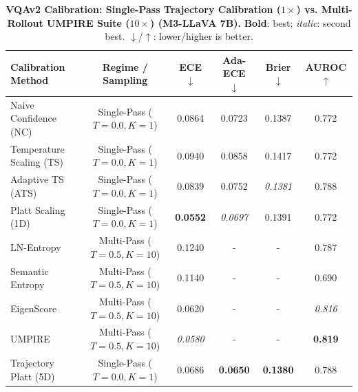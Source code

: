 \begin{table}[t]
\setlength{\tabcolsep}{4pt}
\renewcommand{\arraystretch}{1.05}
\centering
\footnotesize
\begin{tabular}{lccccc}
\toprule
\textbf{Calibration Method} & \textbf{Regime / Sampling} & \textbf{ECE} $\downarrow$ & \textbf{Ada-ECE} $\downarrow$ & \textbf{Brier} $\downarrow$ & \textbf{AUROC} $\uparrow$ \\
\midrule
Naive Confidence (NC) & Single-Pass ($T = 0.0, K = 1$) & 0.0864 & 0.0723 & 0.1387 & 0.772 \\
Temperature Scaling (TS) & Single-Pass ($T = 0.0, K = 1$) & 0.0940 & 0.0858 & 0.1417 & 0.772 \\
Adaptive TS (ATS) & Single-Pass ($T = 0.0, K = 1$) & 0.0839 & 0.0752 & \textit{0.1381} & 0.788 \\
Platt Scaling (1D) & Single-Pass ($T = 0.0, K = 1$) & \textbf{0.0552} & \textit{0.0697} & 0.1391 & 0.772 \\
LN-Entropy & Multi-Pass ($T = 0.5, K = 10$) & 0.1240 & - & - & 0.787 \\
Semantic Entropy & Multi-Pass ($T = 0.5, K = 10$) & 0.1140 & - & - & 0.690 \\
EigenScore & Multi-Pass ($T = 0.5, K = 10$) & 0.0620 & - & - & \textit{0.816} \\
UMPIRE & Multi-Pass ($T = 0.5, K = 10$) & \textit{0.0580} & - & - & \textbf{0.819} \\
Trajectory Platt (5D) & Single-Pass ($T = 0.0, K = 1$) & 0.0686 & \textbf{0.0650} & \textbf{0.1380} & 0.788 \\
\bottomrule
\end{tabular}
\caption{\textbf{VQAv2 Calibration: Single-Pass Trajectory Calibration ($1\times$) vs. Multi-Rollout UMPIRE Suite ($10\times$) (M3-LLaVA 7B).} \textbf{Bold}: best; \textit{italic}: second best. $\downarrow$/$\uparrow$: lower/higher is better.}
\label{tab:vqav2_multirollout_m3}
\end{table}

